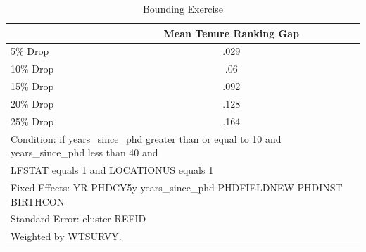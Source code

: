\begin{table}[htbp]\centering
\caption{Bounding Exercise}
\begin{tabular}{l*{1}{c}}
\hline\hline
  &Mean Tenure Ranking Gap\\
\hline
5\% Drop&        .029\\
10\% Drop&         .06\\
15\% Drop&        .092\\
20\% Drop&        .128\\
25\% Drop&        .164\\
\hline\hline
\multicolumn{2}{l}{\footnotesize Condition: if years\_since\_phd greater than or equal to 10 and years\_since\_phd less than 40 and}\\
\multicolumn{2}{l}{\footnotesize LFSTAT equals 1 and LOCATIONUS equals 1}\\
\multicolumn{2}{l}{\footnotesize Fixed Effects: YR PHDCY5y years\_since\_phd PHDFIELDNEW PHDINST BIRTHCON}\\
\multicolumn{2}{l}{\footnotesize Standard Error: cluster REFID}\\
\multicolumn{2}{l}{\footnotesize Weighted by WTSURVY.}\\
\end{tabular}
\end{table}
